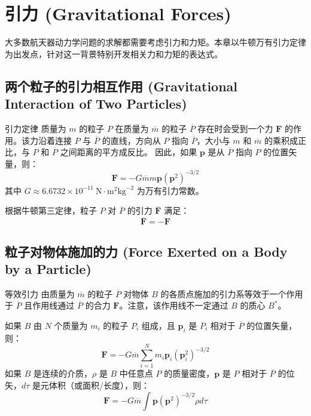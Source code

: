 \chapter{引力 (Gravitational Forces)}

大多数航天器动力学问题的求解都需要考虑引力和力矩。本章以牛顿万有引力定律为出发点，针对这一背景特别开发相关力和力矩的表达式。

\section{两个粒子的引力相互作用 (Gravitational Interaction of Two Particles)}

\begin{mydefinition}{引力定律}
质量为 \(m\) 的粒子 \(P\) 在质量为 \(\overline{m}\) 的粒子 \(\overline{P}\) 存在时会受到一个力 \(\mathbf{F}\) 的作用。该力沿着连接 \(P\) 与 \(\overline{P}\) 的直线，方向从 \(P\) 指向 \(\overline{P}\)，大小与 \(m\) 和 \(\overline{m}\) 的乘积成正比，与 \(P\) 和 \(\overline{P}\) 之间距离的平方成反比。
因此，如果 \(\mathbf{p}\) 是从 \(\overline{P}\) 指向 \(P\) 的位置矢量，则：
\begin{equation}
\mathbf{F} = -G\overline{m}m\mathbf{p}(\mathbf{p}^2)^{-3/2} \tag{1}
\end{equation}
其中 \(G \approx 6.6732 \times 10^{-11} \ \text{N}\cdot\text{m}^2\text{kg}^{-2}\) 为万有引力常数。
\end{mydefinition}

根据牛顿第三定律，粒子 \(P\) 对 \(\overline{P}\) 的引力 \(\overline{\mathbf{F}}\) 满足：
\begin{equation}
\overline{\mathbf{F}} = -\mathbf{F} \tag{2}
\end{equation}

\section{粒子对物体施加的力 (Force Exerted on a Body by a Particle)}

\begin{mydefinition}{等效引力}
由质量为 \(\overline{m}\) 的粒子 \(\overline{P}\) 对物体 \(B\) 的各质点施加的引力系等效于一个作用于 \(\overline{P}\) 且作用线通过 \(\overline{P}\) 的合力 \(\mathbf{F}\)。注意，该作用线不一定通过 \(B\) 的质心 \(B^*\)。
\end{mydefinition}

如果 \(B\) 由 \(N\) 个质量为 \(m_i\) 的粒子 \(P_i\) 组成，且 \(\mathbf{p}_i\) 是 \(P_i\) 相对于 \(\overline{P}\) 的位置矢量，则：
\begin{equation}
\mathbf{F} = -G\overline{m}\sum_{i=1}^N m_i\mathbf{p}_i(\mathbf{p}_i^2)^{-3/2} \tag{1}
\end{equation}
如果 \(B\) 是连续的介质，\(\rho\) 是 \(B\) 中任意点 \(P\) 的质量密度，\(\mathbf{p}\) 是 \(P\) 相对于 \(\overline{P}\) 的位矢，\(d\tau\) 是元体积（或面积/长度），则：
\begin{equation}
\mathbf{F} = -G\overline{m}\int \mathbf{p}(\mathbf{p}^2)^{-3/2}\rho d\tau \tag{2}
\end{equation}

